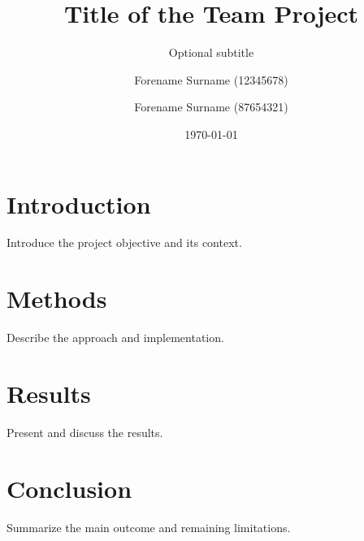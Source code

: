 \documentclass[
  paper=a4,
  fontsize=11pt,
  english,
  numbers=noenddot,
  parskip=half,
  cdgeometry=symmetric,
  cd=barcolor,
  cdfont=false
]{tudscrartcl}
\institute{}
\title{Title of the Team Project}
\subtitle{Optional subtitle}
\author{Forename Surname (12345678)\and Forename Surname (87654321)}
\date{\today}
\begin{document}
\maketitle
\tableofcontents
\clearpage

\section{Introduction}

Introduce the project objective and its context.

\section{Methods}

Describe the approach and implementation.

\section{Results}

Present and discuss the results.

\section{Conclusion}

Summarize the main outcome and remaining limitations.

\printbibliography[heading=bibintoc]

\clearpage
\appendix

\end{document}
